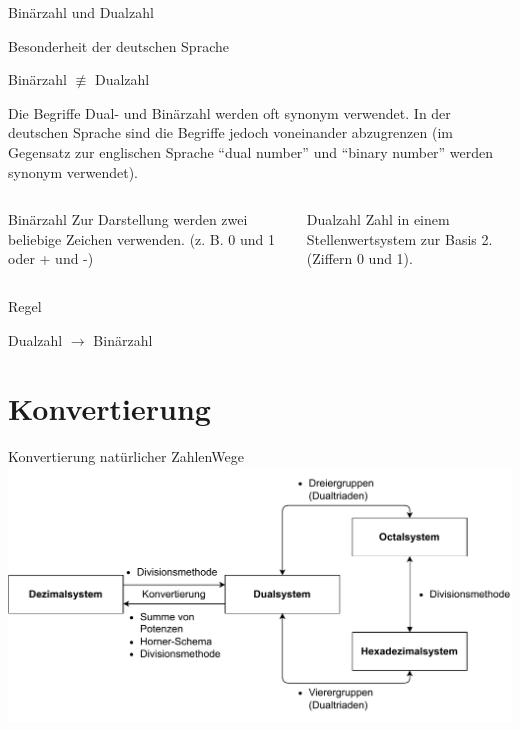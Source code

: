 \documentclass[xelatex,aspectratio=169]{beamer}
\begin{document}
\begin{frame}{Binärzahl und Dualzahl}
  \begin{alertblock}{Besonderheit der deutschen Sprache}
    \begin{center}
      Binärzahl $\not\equiv$ Dualzahl
    \end{center}

    Die Begriffe Dual- und Binärzahl werden oft synonym verwendet. In der deutschen Sprache sind die Begriffe jedoch voneinander abzugrenzen (im Gegensatz zur englischen Sprache \enquote{dual number} und \enquote{binary number} werden synonym verwendet).
  \end{alertblock}
  \begin{columns}[onlytextwidth]
    \begin{column}{0.48\textwidth}
      \begin{block}{Binärzahl}
        Zur Darstellung werden zwei beliebige Zeichen verwenden. (z. B. 0 und 1 oder + und -)
      \end{block}
    \end{column}
    \begin{column}{0.48\textwidth}
      \begin{block}{Dualzahl}
        Zahl in einem Stellenwertsystem zur Basis 2. (Ziffern 0 und 1).
      \end{block}
    \end{column}
  \end{columns}
  \begin{block}{Regel}
    \begin{center}
      Dualzahl $\rightarrow$ Binärzahl
    \end{center}
  \end{block}
\end{frame}

\section{Konvertierung}

\begin{frame}{Konvertierung natürlicher Zahlen}{Wege}
  \includegraphics[width=\textwidth]{fig/zahlensysteme_umwandlung.pdf}
\end{frame}
\end{document}
